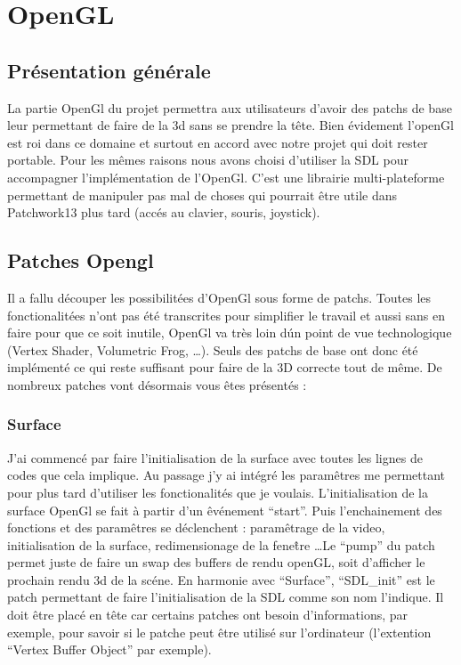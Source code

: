 \section{OpenGL}

\subsection{Pr\'esentation g\'en\'erale}

La partie OpenGl du projet permettra aux utilisateurs d'avoir des patchs
 de base leur permettant de faire de la 3d sans se prendre la t\^ete. Bien
 \'evidement l'openGl est roi dans ce domaine et surtout en accord avec notre 
projet qui doit rester portable.  Pour les m\^emes raisons nous avons
 choisi d'utiliser la SDL pour accompagner l'impl\'ementation de l'OpenGl. 
C'est une librairie multi-plateforme permettant de manipuler pas mal de choses
 qui pourrait \^etre utile dans Patchwork13 plus tard (acc\'es au clavier, 
souris, joystick).


\subsection{Patches Opengl}

Il a fallu d\'ecouper les possibilit\'ees d'OpenGl sous forme de patchs. 
Toutes les fonctionalit\'ees n'ont pas \'et\'e 
transcrites pour simplifier le travail et aussi sans en faire pour que ce
 soit inutile, OpenGl va tr\`es loin d\'un point de  vue technologique 
(Vertex Shader, Volumetric Frog, \ldots). Seuls des patchs de base ont 
donc \'et\'e impl\'ement\'e ce qui reste suffisant pour faire de la 3D 
correcte tout de m\^eme. De nombreux patches vont d\'esormais vous \^etes 
pr\'esent\'es :


\subsubsection{Surface}

J'ai commenc\'e par faire l'initialisation de la surface avec toutes les 
lignes de codes que cela implique. Au passage j'y ai int\'egr\'e les 
param\^etres me permettant pour plus tard d'utiliser les fonctionalit\'es 
que je voulais. L'initialisation de la surface OpenGl se fait \`a partir 
d'un \^ev\'enement ``start''. Puis l'enchainement des fonctions et des
 param\^etres se d\'eclenchent : param\^etrage de la video,
 initialisation de la surface, redimensionage de la fene\^tre \ldots Le 
``pump'' du patch permet juste de faire un swap des buffers de rendu openGL, 
soit d'afficher le prochain rendu 3d de la sc\'ene. En harmonie avec 
``Surface'', ``SDL\_init'' est le patch permettant de faire l'initialisation 
de la SDL comme son nom l'indique. Il doit \^etre plac\'e en t\^ete car 
certains patches ont besoin d'informations, par exemple, pour savoir si 
le patche peut \^etre utilis\'e sur l'ordinateur (l'extention ``Vertex 
Buffer Object'' par exemple). 



